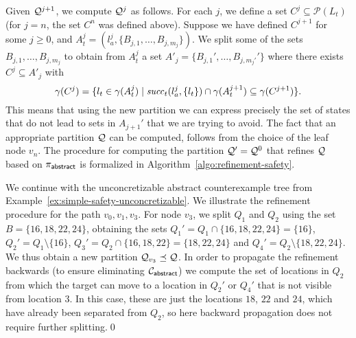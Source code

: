 Given $\mathcal{Q}^{j+1}$, we compute $\mathcal{Q}^j$ as follows. For each $j$, we define a set $C^j \subseteq \mathcal{P}(L_t)$ (for $j=n$, the set $C^n$ was defined above). Suppose we have defined $C^{j+1}$ for some $j \geq 0$, and $A_t^j = (l_a^j,\{B_{j,1},\ldots,B_{j,m_j}\})$. We split some of the sets $B_{j,1},\ldots,B_{j,m_j}$ to obtain from $A_t^j$ a set $A'_j = \{B_{j,1}',\ldots,B_{j,m_j'}'\}$ where there exists $C^j \subseteq A'_j$ with
\[\gamma(C^j) = \{l_t \in \gamma(A_t^j) \mid \mathit{succ}_t(l_a^j,\{l_t\}) \cap \gamma(A_t^{j+1}) \subseteq \gamma(C^{j+1})\}.\]
This means that using the new partition we can express precisely the set of states that do not lead to sets in $A_{j+1}'$ that we are trying to avoid. 
The fact that an appropriate partition $\mathcal{Q}$ can be computed, follows from the choice of the leaf node $v_n$. 
The procedure for computing the partition $\mathcal{Q}' = \mathcal{Q}^0$ that refines $\mathcal{Q}$ based on  $\pi_{\mathsf{abstract}}$ is formalized in Algorithm~\ref{algo:refinement-safety}.
\begin{example}
We continue with the unconcretizable abstract counterexample tree from Example~\ref{ex:simple-safety-unconcretizable}. We illustrate the refinement procedure for the path $v_0,v_1,v_3$. For node $v_3$, we split $Q_1$ and $Q_2$ using the set $B = \{16,18,22,24\}$, obtaining the sets $Q_1' = Q_1 \cap \{16,18,22,24\} = \{16\}$, $Q_2' = Q_1\setminus\{16\}$, $Q_3' = Q_2 \cap \{16,18,22\} = \{18,22,24\}$ and $Q_4' = Q_2 \setminus \{18,22,24\}$. We thus obtain a new partition $\mathcal{Q}_{v_3} \preceq \mathcal{Q}$. In order to propagate the refinement backwards (to ensure eliminating $\mathcal{C}_{\mathsf{abstract}}$) we compute the set of locations in $Q_2$ from which the target can move to a location in $Q_2'$ or $Q_4'$ that is not visible from location $3$. In this case, these are just the locations $18$, $22$ and $24$, which have already been separated from $Q_2$, so here backward propagation does not require further splitting.\qed
\end{example}

